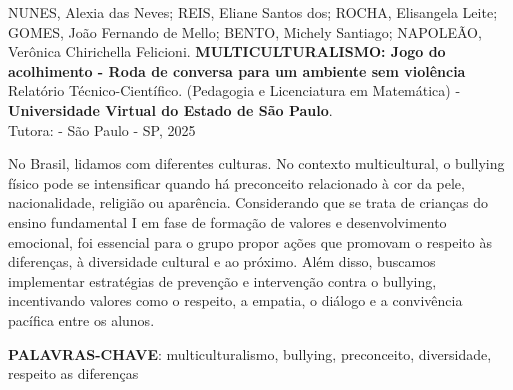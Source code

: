 
{\setlength{\parindent}{0pt}
NUNES, Alexia das Neves; REIS, Eliane Santos dos; ROCHA, Elisangela Leite; GOMES, João Fernando de Mello; BENTO, Michely Santiago; NAPOLEÃO, Verônica Chirichella Felicioni. \textbf{MULTICULTURALISMO: Jogo do acolhimento - Roda de conversa para um ambiente sem violência } Relatório Técnico-Científico. (Pedagogia e Licenciatura em Matemática) - \textbf{Universidade Virtual do Estado de São Paulo}.\\

Tutora: \orientadora \;- São Paulo - SP, 2025

}


\setlength{\absparsep}{18pt} %


\begin{resumo}
	No Brasil, lidamos com diferentes culturas. No contexto multicultural, o bullying físico pode se intensificar quando há preconceito relacionado à cor da pele, nacionalidade, religião ou aparência. Considerando que se trata de crianças do ensino fundamental I em fase de formação de valores e desenvolvimento emocional, foi essencial para o grupo propor ações que promovam o respeito às diferenças, à diversidade cultural e ao próximo. Além disso, buscamos implementar estratégias de prevenção e intervenção contra o bullying, incentivando valores como o respeito, a empatia, o diálogo e a convivência pacífica entre os alunos. 

	\textbf{PALAVRAS-CHAVE}: multiculturalismo, bullying, preconceito, diversidade, respeito as diferenças
\end{resumo}


\listoffigures*
\clearpage


\tableofcontents*
\clearpage

